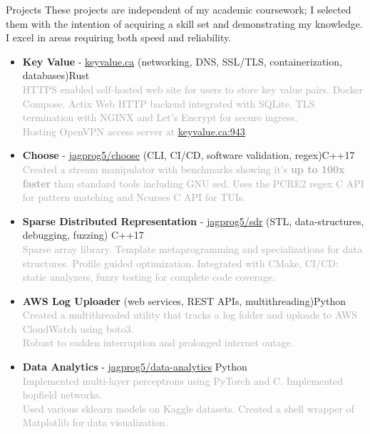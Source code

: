 \documentclass{resume} %
\begin{document}
\begin{rSection}{Projects}
    These projects are independent of my academic coursework; I selected them with the intention of acquiring a skill set and demonstrating my knowledge.
    I excel in areas requiring both speed and reliability.
    \begin{itemize}
        \setlength\itemsep{-0.2em}
        \item {\bf Key Value} - \href{http://www.keyvalue.ca/}{keyvalue.ca} (networking, DNS, SSL/TLS, containerization, databases)\hfill Rust\\
        \textcolor{darkgray}{HTTPS enabled self-hosted web site for users to store key value pairs. Docker Compose. Actix Web HTTP backend integrated with SQLite. TLS termination with NGINX and Let's Encrypt for secure ingress.\\
        Hosting OpenVPN access server at \href{keyvalue.ca:943}{keyvalue.ca:943}.}
        \item {\bf Choose} - \href{https://github.com/jagprog5/choose/}{jagprog5/choose} (CLI, CI/CD, software validation, regex)\hfill C++17\\
        \textcolor{darkgray}{Created a stream manipulator with benchmarks showing it's \textbf{up to 100x faster} than standard tools including GNU sed.
        Uses the PCRE2 regex C API for pattern matching and Ncurses C API for TUIs.}
        \item {\bf Sparse Distributed Representation} - \href{https://github.com/jagprog5/SDR/}{jagprog5/sdr} (STL, data-structures, debugging, fuzzing) \hfill C++17\\
        \textcolor{darkgray}{Sparse array library. Template metaprogramming and specializations for data structures. Profile guided optimization. Integrated with CMake, CI/CD: static analyzers, fuzzy testing for complete code coverage.}
        \item {\bf AWS Log Uploader} (web services, REST APIs, multithreading)\hfill Python\\
        \textcolor{darkgray}{Created a multithreaded utility that tracks a log folder and uploads to AWS CloudWatch using boto3.\\
        Robust to sudden interruption and prolonged internet outage.}
        \item {\bf Data Analytics} - \href{https://github.com/jagprog5/resume/blob/main/data-analytics-projects.md}{jagprog5/data-analytics} \hfill Python\\
        \textcolor{darkgray}{Implemented multi-layer perceptrons using PyTorch and C. Implemented hopfield networks.\\
        Used various sklearn models on Kaggle datasets. Created a shell wrapper of Matplotlib for data visualization.}
    \end{itemize}
\end{rSection}
\end{document}
